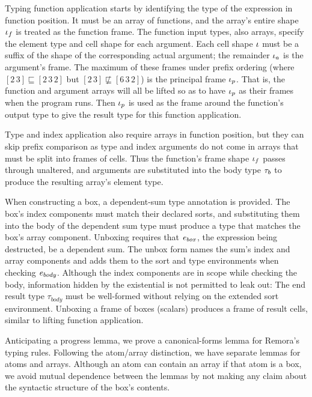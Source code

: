 Typing function application starts by identifying
the type of the expression in function position.
It must be an array of functions,
and the array's entire shape $\mathit{\iota}_f$ is treated as the function frame.
The function input types, also arrays,
specify the element type and cell shape for each argument.
Each cell shape $\mathit{\iota}$ must be a suffix of the shape
of the corresponding actual argument;
the remainder $\mathit{\iota}_a$ is the argument's frame.
The maximum of these frames under prefix ordering
(where $[2\, 3] \sqsubseteq [2\, 3\, 2]$
but $[2\, 3] \not\sqsubseteq [6\, 3\, 2]$)
is the principal frame $\mathit{\iota}_p$.
That is, the function and argument arrays will all be
lifted so as to have $\mathit{\iota}_p$ as their frames when the program runs.
Then $\mathit{\iota}_p$ is used as the frame around the function's output type
to give the result type for this function application.

Type and index application also require arrays in function position,
but they can skip prefix comparison
as type and index arguments do not come in arrays
that must be split into frames of cells.
Thus the function's frame shape $\mathit{\iota}_f$ passes through unaltered,
and arguments are substituted into the body type $\mathit{\tau}_b$
to produce the resulting array's element type.

When constructing a box,
a dependent-sum type annotation is provided.
The box's index components must match their declared sorts,
and substituting them into the body of the dependent sum type
must produce a type that matches the box's array component.
Unboxing requires that $\mathit{e}_\mathit{box}$, the expression being destructed,
be a dependent sum.
The unbox form names the sum's index and array components
and adds them to the sort and type environments
when checking $\mathit{e}_\mathit{body}$.
Although the index components are in scope while checking the body,
information hidden by the existential is not permitted to leak out:
The end result type $\tau_\mathit{body}$ must be well-formed
without relying on the extended sort environment.
Unboxing a frame of boxes (scalars)
produces a frame of result cells,
similar to lifting function application.

Anticipating a progress lemma,
we prove a canonical-forms lemma for Remora's typing rules.
Following the atom/array distinction,
we have separate lemmas for atoms and arrays.
Although an atom can contain an array
if that atom is a box,
we avoid mutual dependence between the lemmas
by not making any claim about the syntactic structure
of the box's contents.

